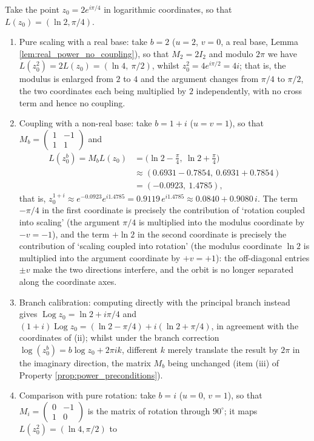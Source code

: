 \begin{example}\label{ex:power_coupling_example}
Take the point $z_0=2e^{i\pi/4}$ in logarithmic coordinates, so that $L(z_0)=(\ln 2,\pi/4)$.
\begin{enumerate}[label=(\roman*)]
    \item Pure scaling with a real base: take $b=2$ ($u=2$, $v=0$, a real base, Lemma \ref{lem:real_power_no_coupling}), so that $M_2=2I_2$ and
    modulo $2\pi$ we have $L(z_0^2)=2L(z_0)=(\ln 4,\ \pi/2)$, whilst $z_0^2=4e^{i\pi/2}=4i$;
    that is, the modulus is enlarged from $2$ to $4$ and the argument changes from $\pi/4$ to $\pi/2$, the two coordinates each being multiplied by $2$ independently, with no cross term and hence no coupling.
    \item Coupling with a non-real base: take $b=1+i$ ($u=v=1$), so that $M_b=\begin{pmatrix}1&-1\\ 1&1\end{pmatrix}$ and
    \[
    \begin{aligned}L(z_0^b)=M_bL(z_0)&=\bigl(\ln 2-\tfrac{\pi}{4},\ \ln 2+\tfrac{\pi}{4}\bigr)\\&\approx(0.6931-0.7854,\ 0.6931+0.7854)\\&=(-0.0923,\ 1.4785),\end{aligned}
    \]
    that is, $z_0^{1+i}\approx e^{-0.0923}e^{i1.4785}=0.9119\,e^{i1.4785}\approx0.0840+0.9080\,i$. The term $-\pi/4$ in the first coordinate is precisely the contribution of `rotation coupled into scaling' (the argument $\pi/4$ is multiplied into the modulus coordinate by $-v=-1$), and the term $+\ln 2$ in the second coordinate is precisely the contribution of `scaling coupled into rotation' (the modulus coordinate $\ln 2$ is multiplied into the argument coordinate by $+v=+1$): the off-diagonal entries $\pm v$ make the two directions interfere, and the orbit is no longer separated along the coordinate axes.
    \item Branch calibration: computing directly with the principal branch instead gives $\operatorname{Log}z_0=\ln 2+i\pi/4$ and $(1+i)\operatorname{Log}z_0=(\ln 2-\pi/4)+i(\ln 2+\pi/4)$, in agreement with the coordinates of (ii); whilst under the branch correction $\log(z_0^b)=b\log z_0+2\pi ik$, different $k$ merely translate the result by $2\pi$ in the imaginary direction, the matrix $M_b$ being unchanged (item (iii) of Property \ref{prop:power_preconditions}).
    \item Comparison with pure rotation: take $b=i$ ($u=0$, $v=1$), so that $M_i=\begin{pmatrix}0&-1\\ 1&0\end{pmatrix}$ is the matrix of rotation through $90^\circ$; it maps $L(z_0^2)=(\ln 4,\pi/2)$ to

\end{enumerate}
\end{example}
